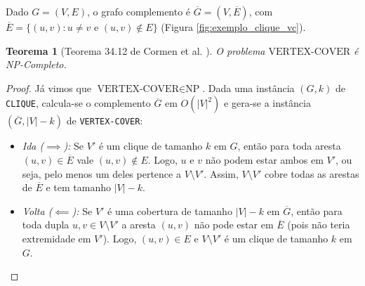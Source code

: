 \documentclass[conference]{IEEEtran}
\theoremstyle{definition}
\theoremstyle{plain}
\newtheorem{teorema}{Teorema}
\begin{document}
Dado $G = (V, E)$, o grafo complemento é $\overline{G} = (V, \overline{E})$, com $\overline{E} = \{(u, v) : u \neq v \text{ e } (u, v) \notin E\}$ (Figura \ref{fig:exemplo_clique_vc}).

\begin{teorema}[Teorema 34.12 de Cormen et al. \cite{cormen2012algoritmos}]
O problema $\text{VERTEX-COVER}$ é NP-Completo.
\end{teorema}

\begin{proof}
Já vimos que $\text{VERTEX-COVER} \in \text{NP}$. Dada uma instância $(G, k)$ de \texttt{CLIQUE}, calcula-se o complemento $\overline{G}$ em $O(|V|^2)$ e gera-se a instância $(\overline{G}, |V| - k)$ de \texttt{VERTEX-COVER}:
\begin{itemize}
    \item \textit{Ida ($\implies$):} Se $V'$ é um clique de tamanho $k$ em $G$, então para toda aresta $(u, v) \in \overline{E}$ vale $(u, v) \notin E$. Logo, $u$ e $v$ não podem estar ambos em $V'$, ou seja, pelo menos um deles pertence a $V \setminus V'$. Assim, $V \setminus V'$ cobre todas as arestas de $\overline{E}$ e tem tamanho $|V| - k$.
    \item \textit{Volta ($\impliedby$):} Se $V'$ é uma cobertura de tamanho $|V| - k$ em $\overline{G}$, então para toda dupla $u, v \in V \setminus V'$ a aresta $(u, v)$ não pode estar em $\overline{E}$ (pois não teria extremidade em $V'$). Logo, $(u, v) \in E$ e $V \setminus V'$ é um clique de tamanho $k$ em $G$.
\end{itemize}
\end{proof}
\end{document}
